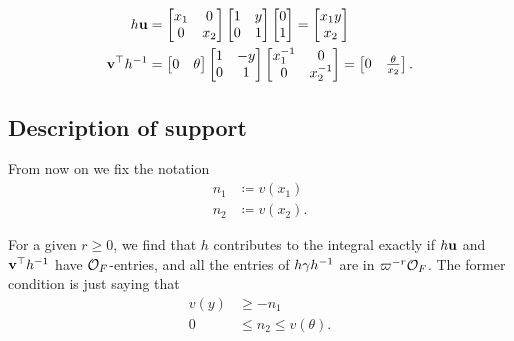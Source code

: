\begin{align*}
  h \mathbf u &=
    \begin{bmatrix} x_1 & 0 \\ 0 & x_2 \end{bmatrix}
    \begin{bmatrix} 1 & y \\ 0 & 1 \end{bmatrix}
    \begin{bmatrix} 0 \\ 1 \end{bmatrix}
    = \begin{bmatrix} x_1 y \\ x_2 \end{bmatrix} \\
  \mathbf v^\top h^{-1} &=
    \begin{bmatrix} 0 & \theta \end{bmatrix}
    \begin{bmatrix} 1 & -y \\ 0 & 1 \end{bmatrix}
    \begin{bmatrix} x_1^{-1} & 0 \\ 0 & x_2^{-1} \end{bmatrix}
    = \begin{bmatrix} 0 & \frac{\theta}{x_2} \end{bmatrix}.
\end{align*}

\subsection{Description of support}
From now on we fix the notation
\begin{align*}
  n_1 &\coloneqq v(x_1) \\
  n_2 &\coloneqq v(x_2).
\end{align*}

For a given $r \ge 0$, we find that $h$ contributes to the integral exactly
if $h\mathbf u$ and $\mathbf v^\top h^{-1}$ have $\mathcal O_F$-entries,
and all the entries of $h \gamma h^{-1}$ are in $\varpi^{-r}\mathcal O_F$.
The former condition is just saying that
\begin{align*}
  v(y) &\ge -n_1 \\
  0 &\le n_2 \le v(\theta).
\end{align*}
